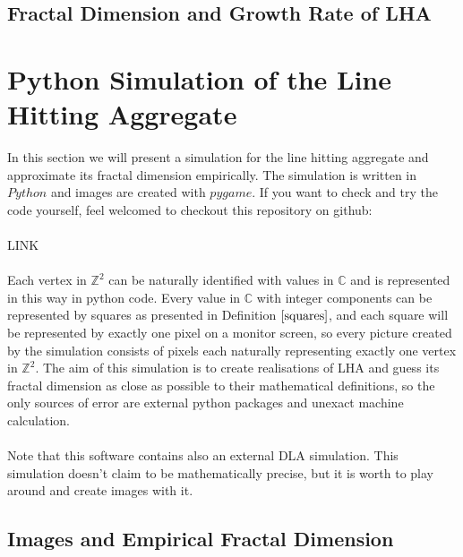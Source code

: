 \documentclass[12pt,a4paper]{scrartcl}
\numberwithin{equation}{subsection}
\newcommand{\C}{\mathbb{C}} %
\newcommand{\Z}{\mathbb{Z}} %
\newcommand{\1}{\mathbbm{1}}
\numberwithin{equation}{section}
\theoremstyle{definition}
\begin{document}
\subsection{Fractal Dimension and Growth Rate of LHA}



\newpage
\section{Python Simulation of the Line Hitting Aggregate}
In this section we will present a simulation for the line hitting aggregate and approximate its fractal dimension empirically. The simulation is written in $\mathit{Python}$ and images are created with $\mathit{pygame}$. If you want to check and try the code yourself, feel welcomed to checkout this repository on github:\\
\\LINK \\
\\Each vertex in $\Z^2$ can be naturally identified with values in $\C$ and is represented in this way in python code. Every value in $\C$ with integer components can be represented by squares as presented in Definition $\ref{squares}$, and each square will be represented by exactly one pixel on a monitor screen, so every picture created by the simulation consists of pixels each naturally representing exactly one vertex in $\Z^2$. The aim of this simulation is to create realisations of LHA and guess its fractal dimension as close as possible to their mathematical definitions, so the only sources of error are external python packages and unexact machine calculation. \\
\\Note that this software contains also an external DLA simulation. This simulation doesn't claim to be mathematically precise, but it is worth to play around and create images with it. 

\subsection{Images and Empirical Fractal Dimension}
\end{document}
